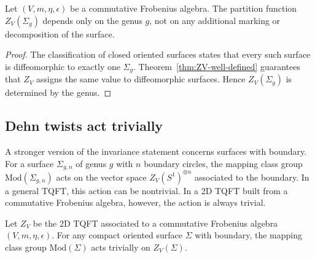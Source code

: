 \begin{proposition}\label{prop:genus-only}
Let $(V,m,\eta,\epsilon)$ be a commutative Frobenius algebra. The partition function $Z_V(\Sigma_g)$ depends only on the genus $g$, not on any additional marking or decomposition of the surface.
\end{proposition}

\begin{proof}
The classification of closed oriented surfaces states that every such surface is diffeomorphic to exactly one $\Sigma_g$. Theorem~\ref{thm:ZV-well-defined} guarantees that $Z_V$ assigns the same value to diffeomorphic surfaces. Hence $Z_V(\Sigma_g)$ is determined by the genus.
\end{proof}

\subsection{Dehn twists act trivially}

A stronger version of the invariance statement concerns surfaces with boundary. For a surface $\Sigma_{g,n}$ of genus $g$ with $n$ boundary circles, the mapping class group $\mathrm{Mod}(\Sigma_{g,n})$ acts on the vector space $Z_V(S^1)^{\otimes n}$ associated to the boundary. In a general TQFT, this action can be nontrivial. In a 2D TQFT built from a commutative Frobenius algebra, however, the action is always trivial.

\begin{theorem}\label{thm:mcg-trivial}
Let $Z_V$ be the 2D TQFT associated to a commutative Frobenius algebra $(V,m,\eta,\epsilon)$. For any compact oriented surface $\Sigma$ with boundary, the mapping class group $\mathrm{Mod}(\Sigma)$ acts trivially on $Z_V(\Sigma)$.
\end{theorem}


